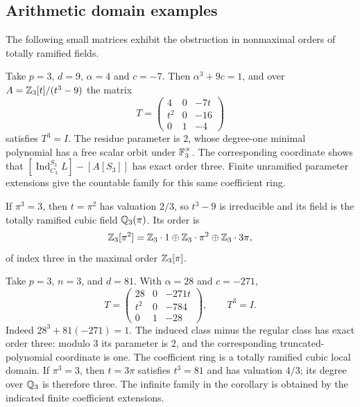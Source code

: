 \subsection{Arithmetic domain examples}

The following small matrices exhibit the obstruction in nonmaximal
orders of totally ramified fields.

\begin{example}\label{ex:cubic-depth-two-nine}
Take $p=3$, $d=9$, $\alpha=4$ and $c=-7$.  Then
$\alpha^3+9c=1$, and over $A=\mathbb Z_3[t]/(t^3-9)$ the matrix
\[
 T=\begin{pmatrix}
 4&0&-7t\\ t^2&0&-16\\0&1&-4
 \end{pmatrix}
\]
satisfies $T^3=I$.  The residue parameter is $2$, whose degree-one
minimal polynomial has a free scalar orbit under
$\mathbb F_3^\times$.  The corresponding coordinate shows that
$[\operatorname{Ind}_{C_3}^{S_3}L]-[A[S_3]]$ has exact order
three.  Finite unramified parameter extensions give the
countable family for this same coefficient ring.

If $\pi^3=3$, then $t=\pi^2$ has valuation $2/3$, so
$t^3-9$ is irreducible and its field is the totally ramified
cubic field $\mathbb Q_3(\pi)$.  Its order is
\[
 \mathbb Z_3[\pi^2]=\mathbb Z_3\cdot1\oplus\mathbb Z_3\cdot\pi^2
                         \oplus\mathbb Z_3\cdot3\pi,
\]
of index three in the maximal order $\mathbb Z_3[\pi]$.
\end{example}

\begin{example}\label{ex:deep-cubic-binomial}
Take $p=3$, $n=3$, and $d=81$.  With $\alpha=28$ and $c=-271$,
\[
 T=\begin{pmatrix}
 28&0&-271t\\ t^2&0&-784\\0&1&-28
 \end{pmatrix},\qquad T^3=I.
\]
Indeed $28^3+81(-271)=1$.  The induced class minus the regular
class has exact order three: modulo $3$ its parameter is $2$,
and the corresponding truncated-polynomial coordinate is one.
The coefficient ring is a totally ramified cubic local domain.
If $\pi^3=3$, then $t=3\pi$ satisfies $t^3=81$ and has valuation
$4/3$; its degree over $\mathbb Q_3$ is therefore three.  The infinite
family in the corollary is obtained by the indicated finite
coefficient extensions.
\end{example}

